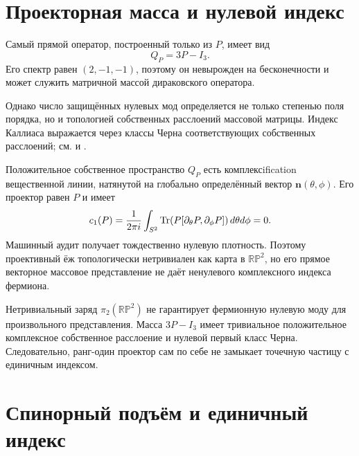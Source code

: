 \section{Проекторная масса и нулевой индекс}

Самый прямой оператор, построенный только из $P$, имеет вид
\begin{equation}
 Q_P=3P-I_3.
 \label{eq:v5-projector-mass-matrix}
\end{equation}
Его спектр равен $(2,-1,-1)$, поэтому он невырожден на бесконечности и
может служить матричной массой дираковского оператора.

Однако число защищённых нулевых мод определяется не только степенью
поля порядка, но и топологией собственных расслоений массовой матрицы.
Индекс Каллиаса выражается через классы Черна соответствующих
собственных расслоений; см.  и
.

Положительное собственное пространство $Q_P$ есть комплексification
вещественной линии, натянутой на глобально определённый вектор
$\mathbf n(\theta,\phi)$. Его проектор равен $P$ и имеет
\begin{equation}
 c_1(P)=\frac1{2\pi i}\int_{S^2}
 \operatorname{Tr}\!\left(P[\partial_\theta P,\partial_\phi P]\right)
 d\theta d\phi=0.
 \label{eq:v5-vector-projector-chern-zero}
\end{equation}
Машинный аудит получает тождественно нулевую плотность. Поэтому
проективный ёж топологически нетривиален как карта в $\mathbb{RP}^2$, но
его прямое векторное массовое представление не даёт ненулевого комплексного
индекса фермиона.

\begin{nogocriterion}
Нетривиальный заряд $\pi_2(\mathbb{RP}^2)$ не гарантирует фермионную
нулевую моду для произвольного представления. Масса $3P-I_3$ имеет
тривиальное положительное комплексное собственное расслоение и нулевой
первый класс Черна. Следовательно, ранг-один проектор сам по себе не
замыкает точечную частицу с единичным индексом.
\end{nogocriterion}

\section{Спинорный подъём и единичный индекс}

